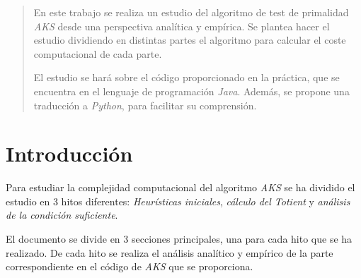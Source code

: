 \documentclass{uc3mpracticas}
\begin{document}
  \frontmatter



  \vspace{55mm}


  \newpage

  \tableofcontents

\newpage

  \mainmatter

  \begin{abstract}
    En este trabajo se realiza un estudio del algoritmo de test de primalidad \textit{AKS} desde una perspectiva analítica y empírica. Se plantea hacer el estudio dividiendo en distintas partes el algoritmo para calcular el coste computacional de cada parte.

    \vspace{2mm}

    El estudio se hará sobre el código proporcionado en la práctica, que se encuentra en el lenguaje de programación \textit{Java}. Además, se propone una traducción a \textit{Python}, para facilitar su comprensión.

  \end{abstract}



  \newpage

  \section{Introducción}

  Para estudiar la complejidad computacional del algoritmo \textit{AKS} se ha dividido el estudio en 3 hitos diferentes: \textit{Heurísticas iniciales}, \textit{cálculo del Totient} y \textit{análisis de la condición suficiente}.

  \vspace{2mm}

  El documento se divide en 3 secciones principales, una para cada hito que se ha realizado. De cada hito se realiza el análisis analítico y empírico de la parte correspondiente en el código de \textit{AKS} que se proporciona.
\end{document}
